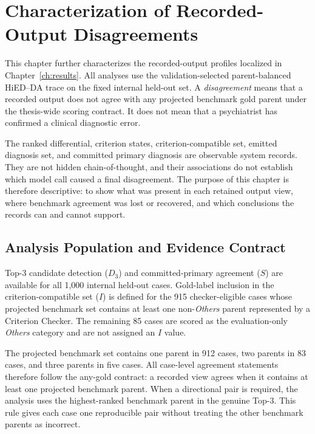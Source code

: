\chapter{Characterization of Recorded-Output Disagreements}
\label{ch:error}

This chapter further characterizes the recorded-output profiles localized in Chapter~\ref{ch:results}. All analyses use the validation-selected parent-balanced HiED--DA trace on the fixed internal held-out set. A \emph{disagreement} means that a recorded output does not agree with any projected benchmark gold parent under the thesis-wide scoring contract. It does not mean that a psychiatrist has confirmed a clinical diagnostic error.

The ranked differential, criterion states, criterion-compatible set, emitted diagnosis set, and committed primary diagnosis are observable system records. They are not hidden chain-of-thought, and their associations do not establish which model call caused a final disagreement. The purpose of this chapter is therefore descriptive: to show what was present in each retained output view, where benchmark agreement was lost or recovered, and which conclusions the records can and cannot support.

\section{Analysis Population and Evidence Contract}
\label{sec:ch8-analysis-population}

Top-3 candidate detection ($D_3$) and committed-primary agreement ($S$) are available for all 1,000 internal held-out cases. Gold-label inclusion in the criterion-compatible set ($I$) is defined for the 915 checker-eligible cases whose projected benchmark set contains at least one non-\emph{Others} parent represented by a Criterion Checker. The remaining 85 cases are scored as the evaluation-only \emph{Others} category and are not assigned an $I$ value.

The projected benchmark set contains one parent in 912 cases, two parents in 83 cases, and three parents in five cases. All case-level agreement statements therefore follow the any-gold contract: a recorded view agrees when it contains at least one projected benchmark parent. When a directional pair is required, the analysis uses the highest-ranked benchmark parent in the genuine Top-3. This rule gives each case one reproducible pair without treating the other benchmark parents as incorrect.

